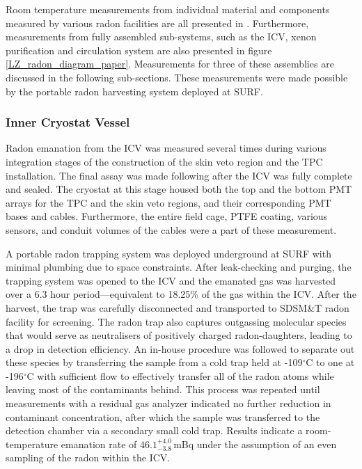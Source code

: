 Room temperature measurements from individual material and components measured by various radon facilities are all presented in \cite{lz_screening}. Furthermore, measurements from fully assembled sub-systems, such as the ICV, xenon purification and circulation system are also presented in figure \ref{LZ_radon_diagram_paper}. Measurements for three of these assemblies are discussed in the following sub-sections. These measurements were made possible by the portable radon harvesting system deployed at SURF. 

\subsubsection{Inner Cryostat Vessel}

Radon emanation from the ICV was measured several times during various integration stages of the construction of the skin veto region and the TPC installation. The final assay was made following after the ICV was fully complete and sealed. The cryostat at this stage housed both the top and the bottom PMT arrays for the TPC and the skin veto regions, and their corresponding PMT bases and cables. Furthermore, the entire field cage, PTFE coating, various sensors, and conduit volumes of the cables were a part of these measurement.

A portable radon trapping system was deployed underground at SURF with minimal plumbing due to space constraints. After leak-checking and purging, the trapping system was opened to the ICV and the emanated gas was harvested over a 6.3 hour period---equivalent to 18.25\% of the gas within the ICV. After the harvest, the trap was carefully disconnected and transported to SDSM\&T radon facility for screening. The radon trap also captures outgassing molecular species that would serve as neutralisers of positively charged radon-daughters, leading to a drop in detection efficiency. An in-house procedure was followed to separate out these species by transferring the sample from a cold trap held at -109$^{\circ{}}$C to one at -196$^{\circ{}}$C with sufficient flow to effectively transfer all of the radon atoms while leaving most of the contaminants behind. This process was repeated until measurements with a residual gas analyzer indicated no further reduction in contaminant concentration, after which the sample was transferred to the detection chamber via a secondary small cold trap. Results indicate a room-temperature emanation rate of $46.1^{+4.0}_{-3.8}\,$mBq under the assumption of an even sampling of the radon within the ICV.


